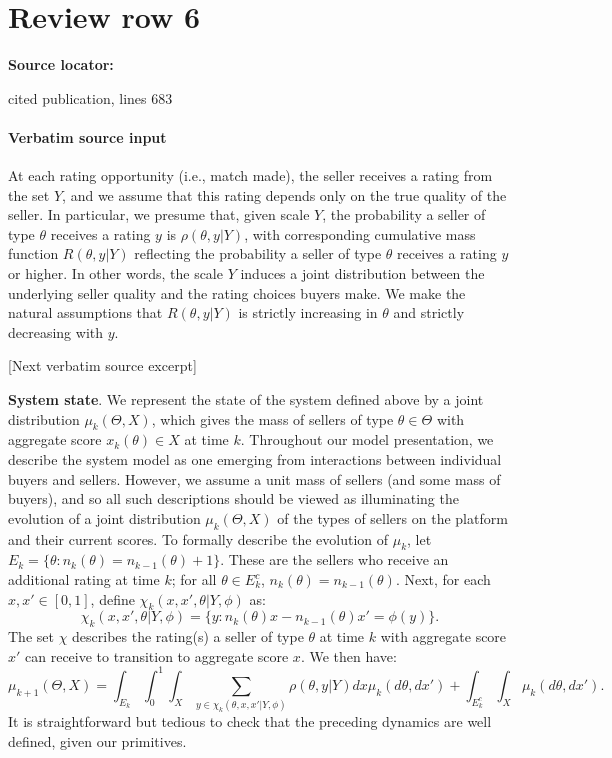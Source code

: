 \documentclass[10pt]{article}
\begin{document}
\section*{Review row 6}
\textbf{Source locator:} {\footnotesize\raggedright cited publication, lines 683\par}
\paragraph{Verbatim source input}
\begin{ReviewVerbatim}
At each rating opportunity (i.e., match made), the seller receives a rating from the set $Y$, and we assume that this rating depends only on the true quality of the seller. In particular, we presume that, given scale $Y$, the probability a seller of type $\theta$ receives a rating $y$ is $\rho(\theta, y | Y)$, with corresponding cumulative mass function $R(\theta,y| Y)$ reflecting the probability a seller of type $\theta$ receives a rating $y$ or higher. In other words, the scale $Y$ induces a joint distribution between the underlying seller quality and the rating choices buyers make. We make the natural assumptions that $R(\theta,y| Y)$ is strictly increasing in $\theta$ and strictly decreasing with $y$.

[Next verbatim source excerpt]

{\bf System state}.  We represent the state of the system defined above by a joint distribution $\mu_k(\Theta, X)$, which gives the mass of sellers of type $\theta \in \Theta$ with aggregate score $x_k(\theta) \in X$ at time $k$. Throughout our model presentation, we describe the system model as one emerging from interactions between individual buyers and sellers. However, we assume a unit mass of sellers (and some mass of buyers), and so all such descriptions should be viewed as illuminating the evolution of a joint distribution $\mu_k (\Theta, X)$ of the types of sellers on the platform and their current scores. To formally describe the evolution of $\mu_k$, let $E_k = \{ \theta : n_k(\theta) = n_{k-1}(\theta) + 1 \}$.  These are the sellers who receive an additional rating at time $k$; for all $\theta \in E_k^c$, $n_k(\theta) = n_{k-1}(\theta)$.  Next, for each $x, x' \in [0,1]$, define $\chi_k(x, x',\theta | Y, {\phi})$ as:
\[
{\chi_k(x, x',\theta | Y, \phi) =} \{ y : n_k(\theta)x - n_{k-1}(\theta)x' = \phi(y) \}.
\]
The set $\chi$ describes the rating(s) a seller of type $\theta$ at time $k$ with aggregate score $x'$ can receive to transition to aggregate score $x$.  We then have:
\[ \mu_{k+1}(\Theta, X) = \int_{E_k} \int_0^1 \int_X \sum_{y \in \chi_k(\theta, x, x' | Y, \phi)} \rho(\theta, y | Y)  dx \mu_k(d\theta, dx') + \int_{E_k^c} \int_X \mu_k(d\theta, dx'). \]
It is straightforward but tedious to check that the preceding dynamics are well defined, given our primitives.



\end{ReviewVerbatim}
\end{document}

